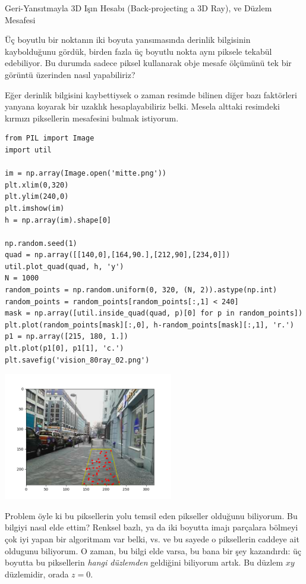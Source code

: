 \documentclass[12pt,fleqn]{article}\usepackage{../../common}
\begin{document}
Geri-Yansıtmayla 3D Işın Hesabı (Back-projecting a 3D Ray), ve Düzlem Mesafesi

Üç boyutlu bir noktanın iki boyuta yansımasında derinlik bilgisinin
kaybolduğunu gördük, birden fazla üç boyutlu nokta aynı piksele tekabül
edebiliyor. Bu durumda sadece piksel kullanarak obje mesafe ölçümünü tek
bir görüntü üzerinden nasıl yapabiliriz? 

Eğer derinlik bilgisini kaybettiysek o zaman resimde bilinen diğer bazı
faktörleri yanyana koyarak bir uzaklık hesaplayabiliriz belki. Mesela
alttaki resimdeki kırmızı piksellerin mesafesini bulmak istiyorum.

\begin{verbatim}
from PIL import Image
import util

im = np.array(Image.open('mitte.png'))
plt.xlim(0,320)
plt.ylim(240,0)
plt.imshow(im)
h = np.array(im).shape[0]

np.random.seed(1)
quad = np.array([[140,0],[164,90.],[212,90],[234,0]])
util.plot_quad(quad, h, 'y')
N = 1000 
random_points = np.random.uniform(0, 320, (N, 2)).astype(np.int)
random_points = random_points[random_points[:,1] < 240]
mask = np.array([util.inside_quad(quad, p)[0] for p in random_points])
plt.plot(random_points[mask][:,0], h-random_points[mask][:,1], 'r.')
p1 = np.array([215, 180, 1.])
plt.plot(p1[0], p1[1], 'c.')
plt.savefig('vision_80ray_02.png')
\end{verbatim}

\includegraphics[width=20em]{vision_80ray_02.png}

Problem öyle ki bu piksellerin yolu temsil eden pikseller olduğunu
biliyorum. Bu bilgiyi nasıl elde ettim? Renksel bazlı, ya da iki boyutta
imajı parçalara bölmeyi çok iyi yapan bir algoritmam var belki, vs. ve bu
sayede o piksellerin caddeye ait oldugunu biliyorum. O zaman, bu bilgi elde
varsa, bu bana bir şey kazandırdı: üç boyutta bu piksellerin {\em hangi
  düzlemden} geldiğini biliyorum artık. Bu düzlem $xy$ düzlemidir, orada
$z=0$.
\end{document}
